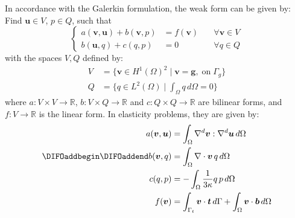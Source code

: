 In accordance with the Galerkin formulation, the weak form can be given by:
Find $\boldsymbol{u} \in V$, $p \in Q$, such that
\begin{equation}\label{weak_form}
\left\{
\begin{aligned}
a(\boldsymbol{v}, \boldsymbol{u}) + b(\boldsymbol{v}, p) &= f(\boldsymbol{v}) \quad &\forall \boldsymbol{v} \in V \\
b(\boldsymbol{u}, q) + c(q, p) &= 0 \quad &\forall q \in Q
\end{aligned}
\right.
\end{equation}
with the spaces $V, Q$ defined by:
\begin{align}\label{mix_formulation}
V &= \{\boldsymbol{v} \in H^1(\Omega)^2 \mid \boldsymbol{v} = \boldsymbol{g}, \; \textrm{on} \; \Gamma_g\}
\\
Q &= \{q \in L^2(\Omega) \mid \textstyle{\int_{\Omega}} q \, d\Omega = 0\}
\end{align}
where $a: V \times V \rightarrow \mathbb{R}$, $b: V \times Q \rightarrow \mathbb{R}$ and $c: Q \times Q \rightarrow \mathbb{R}$ are bilinear forms, and $f: V \rightarrow \mathbb{R}$ is the linear form. In elasticity problems, they are given by:
\begin{align}
a(\boldsymbol{v}, \boldsymbol{u}) &= \int_\Omega \nabla^d \boldsymbol{v} : \nabla^d \boldsymbol{u} \, d\Omega \\
\DIFaddbegin \label{form_b}
\DIFaddend b(\boldsymbol{v}, q) &= \int_\Omega \nabla \cdot \boldsymbol{v} \, q \, d\Omega \\
\label{form_c}
c(q, p) &= -\int_\Omega \frac{1}{3\kappa} q \, p \, d\Omega \\
f(\boldsymbol{v}) &= \int_{\Gamma_t} \boldsymbol{v} \cdot \boldsymbol{t} \, d\Gamma + \int_{\Omega} \boldsymbol{v} \cdot \boldsymbol{b} \, d\Omega
\end{align}

